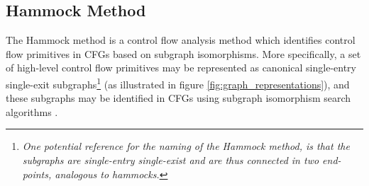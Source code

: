 
\subsection{Hammock Method}
\label{sec:hammock_method}

The Hammock method is a control flow analysis method which identifies control flow primitives in CFGs based on subgraph isomorphisms. More specifically, a set of high-level control flow primitives may be represented as canonical single-entry single-exit subgraphs\footnote{\textit{One potential reference for the naming of the Hammock method, is that the subgraphs are single-entry single-exist and are thus connected in two end-points, analogous to hammocks.}} (as illustrated in figure \ref{fig:graph_representations}), and these subgraphs may be identified in CFGs using subgraph isomorphism search algorithms \cite{node_splitting}.

